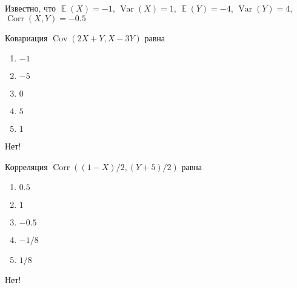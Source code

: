 \documentclass[t]{beamer}
\DeclareMathOperator{\Var}{Var}
\DeclareMathOperator{\Cov}{Cov}
\DeclareMathOperator{\Corr}{Corr}
\DeclareMathOperator{\E}{\mathbb{E}}
\begin{document}
 \begin{frame} \label{25-No} 
\begin{block}{25} 

Известно, что $\E(X)=-1$, $\Var(X)=1$, $\E(Y)=-4$, $\Var(Y)=4$, $\Corr(X,Y)=-0.5$

\vspace{0.5cm} 
 
Ковариация $\Cov(2X+Y,X-3Y)$ равна
 


 \end{block} 
\begin{enumerate} 
\item[] \hyperlink{25-No}{\beamergotobutton{} $-1$
}
\item[] \hyperlink{25-Yes}{\beamergotobutton{} $-5$}
\item[] \hyperlink{25-No}{\beamergotobutton{} $0$}
\item[] \hyperlink{25-No}{\beamergotobutton{} $5$}
\item[] \hyperlink{25-No}{\beamergotobutton{} $1$}
\end{enumerate} 

 \alert{Нет!} 
\end{frame} 


 \begin{frame} \label{26-No} 
\begin{block}{26} 

Корреляция $\Corr((1-X)/2,(Y+5)/2)$ равна
 


 \end{block} 
\begin{enumerate} 
\item[] \hyperlink{26-Yes}{\beamergotobutton{} $0.5$}
\item[] \hyperlink{26-No}{\beamergotobutton{} $1$
}
\item[] \hyperlink{26-No}{\beamergotobutton{} $-0.5$}
\item[] \hyperlink{26-No}{\beamergotobutton{} $-1/8$}
\item[] \hyperlink{26-No}{\beamergotobutton{} $1/8$}
\end{enumerate} 

 \alert{Нет!} 
\end{frame} 
\end{document}
